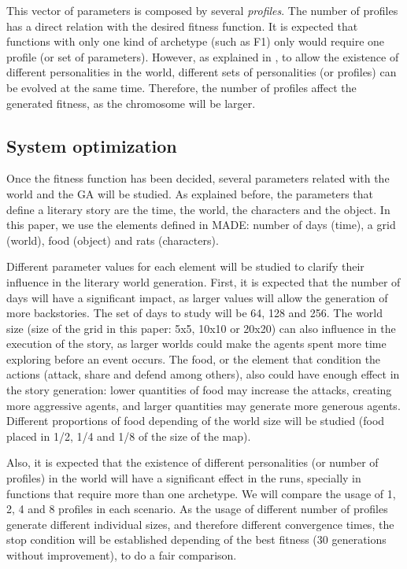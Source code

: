 \documentclass[runningheads,a4paper]{llncs}
\begin{document}
This vector of parameters is composed by several {\em profiles}. The number of profiles has a direct relation with the desired fitness function. It is expected that functions with only one kind of archetype (such as F1) only would require one profile (or set of parameters). However, as explained in \cite{garcia14my}, to allow the existence of different personalities in the world, different sets of personalities (or profiles) can be evolved at the same time. Therefore, the number of profiles affect the generated fitness, as the chromosome will be larger. 


\subsection{System optimization}


Once the fitness function has been decided, several parameters related with the world and the GA will be studied. As explained before, the parameters that define a literary story are the time, the world, the characters and the object. In this paper, we use the elements defined in MADE: number of days (time), a grid (world), food (object) and rats (characters).


Different parameter values for each element will be studied to clarify their influence in the literary world generation. First, it is expected that the number of days will have a significant impact, as larger values will allow the generation of more backstories. The set of days to study will be 64, 128 and 256. The world size (size of the grid in this paper: 5x5, 10x10 or 20x20) can also influence in the execution of the story, as larger worlds could make the agents spent more time exploring before an event occurs. The food, or the element that condition the actions (attack, share and defend among others), also could have enough effect in the story generation: lower quantities of food may increase the attacks, creating more aggressive agents, and larger quantities may generate more generous agents. Different proportions of food depending of the world size will be studied (food placed in 1/2, 1/4 and 1/8 of the size of the map).

Also, it is expected that the existence of different personalities (or number of profiles) in the world will have a significant effect in the runs, specially in functions that require more than one archetype. We will compare the usage of 1, 2, 4 and 8 profiles in each scenario. As the usage of different number of profiles generate different
individual sizes, and therefore different convergence times, the stop
condition will be established depending of the best fitness (30 generations without improvement), to do a fair comparison.
\end{document}
